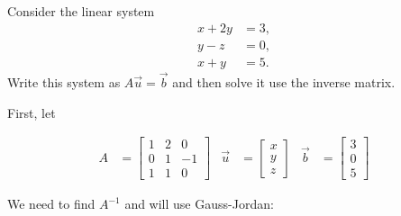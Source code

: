 \begin{example}
Consider the linear system
\begin{align*}
x+2y & = 3, \\
y-z & = 0, \\
x+ y & = 5. 
\end{align*}
Write this system as $A\vec{u}=\vec{b}$ and then solve it use the inverse matrix. 

\solution

First, let

\begin{align*}
A & = 
\begin{bmatrix}
1 & 2 & 0 \\
0 & 1 & -1 \\
1 & 1 & 0 
\end{bmatrix}
& \vec{u} & = \begin{bmatrix}
x \\ y \\ z
\end{bmatrix}
& \vec{b} & = \begin{bmatrix}
3 \\ 0 \\ 5
\end{bmatrix}
\end{align*}

We need to find $A^{-1}$ and will use Gauss-Jordan:


\end{example}

